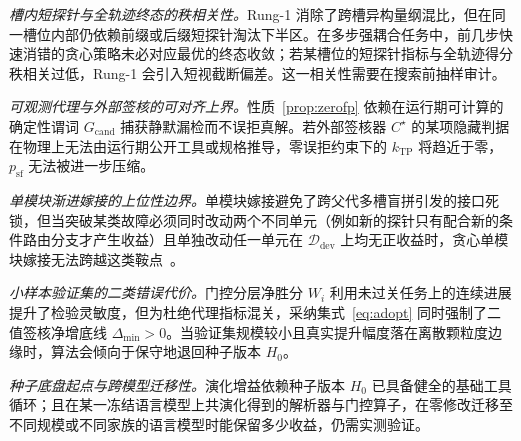 \documentclass[UTF8,a4paper,10.5pt]{ctexart}
\newcommand{\Ddev}{\mathcal{D}_{\mathrm{dev}}}
\begin{document}
\emph{槽内短探针与全轨迹终态的秩相关性。}Rung-1 消除了跨槽异构量纲混比，但在同一槽位内部仍依赖前缀或后缀短探针淘汰下半区。在多步强耦合任务中，前几步快速消错的贪心策略未必对应最优的终态收敛；若某槽位的短探针指标与全轨迹得分秩相关过低，Rung-1 会引入短视截断偏差。这一相关性需要在搜索前抽样审计。

\emph{可观测代理与外部签核的可对齐上界。}性质~\ref{prop:zerofp} 依赖在运行期可计算的确定性谓词 $G_{\mathrm{cand}}$ 捕获静默漏检而不误拒真解。若外部签核器 $C^\star$ 的某项隐藏判据在物理上无法由运行期公开工具或规格推导，零误拒约束下的 $k_{\mathrm{TP}}$ 将趋近于零，$p_{\mathrm{sf}}$ 无法被进一步压缩。

\emph{单模块渐进嫁接的上位性边界。}单模块嫁接避免了跨父代多槽盲拼引发的接口死锁，但当突破某类故障必须同时改动两个不同单元（例如新的探针只有配合新的条件路由分支才产生收益）且单独改动任一单元在 $\Ddev$ 上均无正收益时，贪心单模块嫁接无法跨越这类鞍点~\cite{gcjr}。

\emph{小样本验证集的二类错误代价。}门控分层净胜分 $W_i$ 利用未过关任务上的连续进展提升了检验灵敏度，但为杜绝代理指标混关，采纳集式~\eqref{eq:adopt} 同时强制了二值签核净增底线 $\Delta_{\min}>0$。当验证集规模较小且真实提升幅度落在离散颗粒度边缘时，算法会倾向于保守地退回种子版本 $H_0$。

\emph{种子底盘起点与跨模型迁移性。}演化增益依赖种子版本 $H_0$ 已具备健全的基础工具循环；且在某一冻结语言模型上共演化得到的解析器与门控算子，在零修改迁移至不同规模或不同家族的语言模型时能保留多少收益，仍需实测验证。
\end{document}
